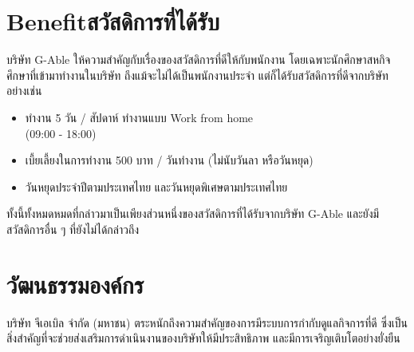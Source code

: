 \section{\ifenglish Benefit\else สวัสดิการที่ได้รับ\fi}
บริษัท G-Able ให้ความสำคัญกับเรื่องของสวัสดิการที่ดีให้กับพนักงาน โดยเฉพาะนักศึกษาสหกิจศึกษาที่เข้ามาทำงานในบริษัท
ถึงแม้จะไม่ได้เป็นพนักงานประจำ แต่ก็ได้รับสวัสดิการที่ดีจากบริษัทอย่างเช่น
\begin{itemize}
      \item ทำงาน 5 วัน / สัปดาห์ ทำงานแบบ Work from home \\(09:00 - 18:00)
      \item เบี้ยเลี้ยงในการทำงาน 500 บาท / วันทำงาน (ไม่นับวันลา หรือวันหยุด)
      \item วันหยุดประจำปีตามประเทศไทย และวันหยุดพิเศษตามประเทศไทย
\end{itemize}
ทั้งนี้ทั้งหมดหมดที่กล่าวมาเป็นเพียงส่วนหนึ่งของสวัสดิการที่ได้รับจากบริษัท G-Able และยังมีสวัสดิการอื่น ๆ ที่ยังไม่ได้กล่าวถึง

\section{วัฒนธรรมองค์กร}
บริษัท จีเอเบิล จำกัด (มหาชน) ตระหนักถึงความสำคัญของการมีระบบการกำกับดูแลกิจการที่ดี ซึ่งเป็นสิ่งสำคัญที่จะช่วยส่งเสริมการดำเนินงานของบริษัทให้มีประสิทธิภาพ และมีการเจริญเติบโตอย่างยั่งยืน

\clearpage